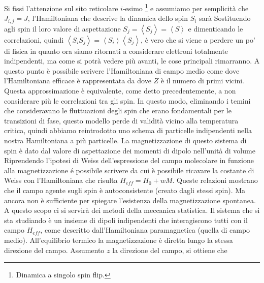 Si fissi l'attenzione sul sito reticolare $i$-esimo \footnote{Dinamica a singolo spin flip.} e assumiamo per semplicit\`a che $J_{i,j} = J$, l'Hamiltoniana che descrive la dinamica dello spin $S_i$ sar\`a
Sostituendo agli spin il loro valore di aspettazione $S_j = \left\langle S_j \right\rangle = \left\langle S \right\rangle$ e dimenticando le correlazioni, quindi $\left\langle S_iS_j \right\rangle = \left\langle S_i \right\rangle \left\langle S_j \right\rangle$, \`e vero che si viene a perdere un po' di fisica in quanto ora siamo ritornati a considerare elettroni totalmente indipendenti, ma come si potr\`a vedere pi\`u avanti, le cose principali rimarranno. A questo punto \`e possibile scrivere l'Hamiltoniana di campo medio come
dove l'Hamiltoniana efficace \`e rappresentata da
dove $Z$ \`e il numero di primi vicini. Questa approssimazione \`e equivalente, come detto precedentemente, a non considerare pi\`u le correlazioni tra gli spin. In questo modo, eliminando i temini che consideravano le fluttuazioni degli spin che erano fondamentali per le transizioni di fase, questo modello perde di validit\`a vicino alla temperatura critica, quindi abbiamo reintrodotto uno schema di particelle indipendenti nella nostra Hamiltoniana a pi\`u particelle. La magnetizzazione di questo sistema di spin \`e dato dal valore di aspettazione dei momenti di dipolo nell'unit\`a di volume
Riprendendo l'ipotesi di Weiss dell'espressione del campo molecolare in funzione alla magnetizzazione \'e possibile scrivere
da cui \`e possibile ricavare la costante di Weiss
con l'Hamiltoniana che risulta $H_{eff} = H_0 + wM$. Queste relazioni mostrano che il campo agente sugli spin \`e autoconsistente (creato dagli stessi spin).
Ma ancora non \`e sufficiente per spiegare l'esistenza della magnetizzazione spontanea. A questo scopo ci si servir\`a dei metodi della meccanica statistica. Il sistema che si sta studiando \`e un insieme di dipoli indipendenti che interagiscono tutti con il campo $H_{eff}$, come descritto dall'Hamiltoniana paramagnetica (quella di campo medio). All'equilibrio termico la magnetizzazione \`e diretta lungo la stessa direzione del campo. Assumento $z$ la direzione del campo, si ottiene che 
